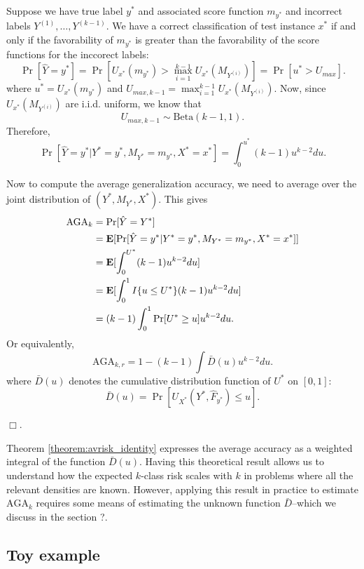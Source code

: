 \documentclass[12pt]{article}
\begin{document}
Suppose we have true label $y^*$ and associated score function $m_{y^*}$ and incorrect labels
$Y^{(1)},\hdots, Y^{(k-1)}$.  
We have a correct classification of test instance $x^*$ if and only if the favorability of $m_{y^*}$ is greater than the favorability of the score functions for the inccorect labels:
\[
\Pr[\hat{Y} = y^*] = \Pr[U_{x^*}(m_{y^*}) > \max_{i=1}^{k-1} U_{x^*}(M_{Y^{(i)}})] =  \Pr[u^* > U_{max}].
\]
where $u^* = U_{x^*}(m_{y^*})$ and $U_{max, k-1}
= \max_{i=1}^{k-1} U_{x^*}(M_{Y^{(i)}})$. 
Now, since
$U_{x^*}(M_{Y^{(i)}})$ are i.i.d. uniform, we know that
\begin{equation}\label{eq:umax_beta}
U_{max, k-1} \sim \text{Beta}(k-1, 1). 
\end{equation}
Therefore,
\[
\Pr[\hat{Y} = y^*|Y^* = y^*, M_{Y^*} = m_{y^*}, X^* = x^*] = \int_0^{u^*} (k-1) u^{k-2} du.
\]

Now to compute the average generalization accuracy, we need to average over the joint distribution of $(Y^*, M_{Y^*}, X^*)$.  This gives
\begin{align*}
\text{AGA}_{k} &= \Pr[\hat{Y} = Y^*]
\\&= \textbf{E}[\Pr[\hat{Y} = y^*|Y^* = y^*, M_{Y^*} = m_{y^*}, X^* = x^*] ]
\\&= \textbf{E}[\int_0^{U^*} (k-1) u^{k-2} du] 
\\&= \textbf{E}[\int_0^1 I\{u \leq U^*\} (k-1) u^{k-2} du ]
\\&= (k-1) \int_0^1 \Pr[U^* \geq u] u^{k-2} du.
\end{align*}
Or equivalently,
\[
\text{AGA}_{k, r} = 1 - (k-1) \int \bar{D}(u) u^{k-2} du.
\]
where $\bar{D}(u)$ denotes the cumulative distribution function of $U^*$ on $[0,1]$:
\begin{equation}\label{eq:Kbar}
\bar{D}(u) = \Pr[U_{X^*}(Y^*, \hat{F}_{y^*}) \leq u].
\end{equation}

$\Box$.


Theorem \ref{theorem:avrisk_identity} expresses the average accuracy as a weighted integral of the function $\bar{D}(u)$.
Having this theoretical result allows us to understand how the
expected $k$-class risk scales with $k$ in problems where all the
relevant densities are known.  However, applying this result in
practice to estimate $\text{AGA}_k$ requires some means of
estimating the unknown function $\bar{D}$--which we discuss in the
section ?.

\subsection{Toy example}
\end{document}
